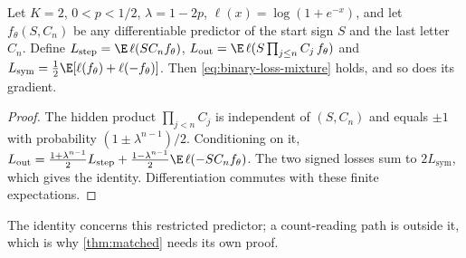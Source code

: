 
\begin{lemma}
\label{lem:binary-loss-mixture}
Let $K=2$, $0<p<1/2$, $\lambda=1-2p$, $\ell(x)=\log(1+e^{-x})$, and let $f_\theta(S,C_n)$ be any differentiable
predictor of the start sign $S$ and the last letter $C_n$. Define
$L_{\mathrm{step}}=\E\,\ell(SC_nf_\theta)$, $L_{\mathrm{out}}=\E\,\ell(S\prod_{j\le n}C_j\,f_\theta)$ and
$L_{\mathrm{sym}}=\frac12\E[\ell(f_\theta)+\ell(-f_\theta)]$. Then \cref{eq:binary-loss-mixture} holds, and so does its gradient.
\end{lemma}
\begin{proof}
The hidden product $\prod_{j<n}C_j$ is independent of $(S,C_n)$ and equals $\pm1$ with probability
$(1\pm\lambda^{n-1})/2$. Conditioning on it,
$L_{\mathrm{out}}=\frac{1+\lambda^{n-1}}2L_{\mathrm{step}}+\frac{1-\lambda^{n-1}}2\E\,\ell(-SC_nf_\theta)$.
The two signed losses sum to $2L_{\mathrm{sym}}$, which gives the identity. Differentiation commutes with these finite expectations.
\end{proof}
The identity concerns this restricted predictor; a count-reading path is outside it, which is why
\cref{thm:matched} needs its own proof.

